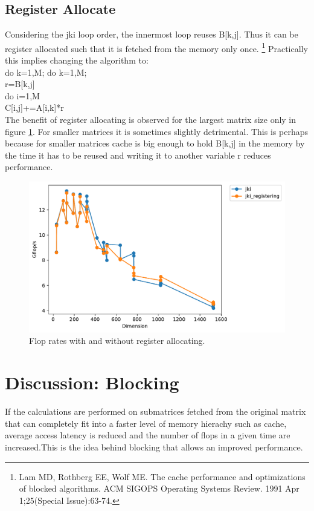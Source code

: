 \documentclass{article}
\begin{document}
\subsection{Register Allocate}\label{sec:RegisterAllocate}
Considering the jki loop order, the innermost loop reuses B[k,j]. Thus it can be register allocated such that it is fetched from the memory only once. \footnote{\label{Ref1}Lam MD, Rothberg EE, Wolf ME. The cache performance and optimizations of blocked algorithms. ACM SIGOPS Operating Systems Review. 1991 Apr 1;25(Special Issue):63-74.} Practically this implies changing the algorithm to:  
\\do k=1,M;	do k=1,M;	\\r=B[k,j]\\do i=1,M
\\ C[i,j]+=A[i,k]*r\\
The benefit of register allocating is observed for the largest matrix size only in figure \ref{fig:Registering}. For smaller matrices it is sometimes slightly detrimental. This is perhaps because for smaller matrices cache is big enough to hold B[k,j] in the memory by the time it has to be reused and writing it to another variable r reduces performance.\footnotemark[\ref{Ref1}]
\begin{figure}[h!]
	\centering
	\includegraphics[width=0.8\columnwidth]{timing_jki_registering.pdf}
	\caption{Flop rates with and without register allocating.}
	\label{fig:Registering}
\end{figure}
\section{Discussion: Blocking}

If the calculations are performed on submatrices fetched from the original matrix that can completely fit into a faster level of memory hierachy such as cache, average access latency is reduced and the number of flops in a given time are increased.\footnotemark[\ref{Ref1}] This is the idea behind blocking that allows an improved performance. 
\end{document}
